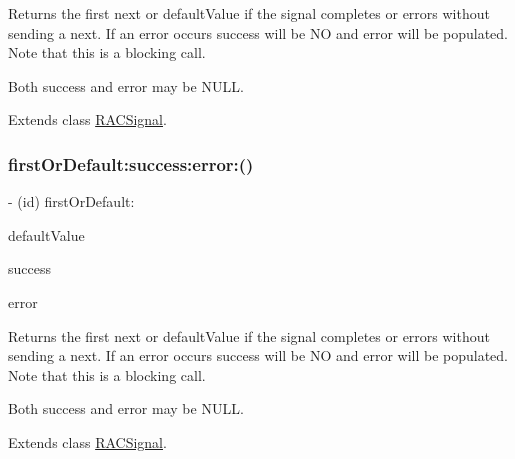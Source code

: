 Returns the first {\ttfamily next} or {\ttfamily default\+Value} if the signal completes or errors without sending a {\ttfamily next}. If an error occurs success will be NO and error will be populated. Note that this is a blocking call.

Both success and error may be N\+U\+LL. 

Extends class \mbox{\hyperlink{interface_r_a_c_signal_a12b765a16842e9c7aa1d13b00d8df09b}{R\+A\+C\+Signal}}.

\mbox{\label{category_r_a_c_signal_07_operations_08_a12b765a16842e9c7aa1d13b00d8df09b}} 
\subsubsection{\texorpdfstring{first\+Or\+Default\+:success\+:error\+:()}{firstOrDefault:success:error:()}\hspace{0.1cm}{\footnotesize\ttfamily [3/3]}}
{\footnotesize\ttfamily -\/ (id) first\+Or\+Default\+: \begin{DoxyParamCaption}\item[{(id)}]{default\+Value }\item[{success:(B\+O\+OL $\ast$)}]{success }\item[{error:(N\+S\+Error $\ast$$\ast$)}]{error }\end{DoxyParamCaption}}

Returns the first {\ttfamily next} or {\ttfamily default\+Value} if the signal completes or errors without sending a {\ttfamily next}. If an error occurs success will be NO and error will be populated. Note that this is a blocking call.

Both success and error may be N\+U\+LL. 

Extends class \mbox{\hyperlink{interface_r_a_c_signal_a12b765a16842e9c7aa1d13b00d8df09b}{R\+A\+C\+Signal}}.

\mbox{\label{category_r_a_c_signal_07_operations_08_a72e5f2fd80960ee5422e08ceef0f4e2c}} 
